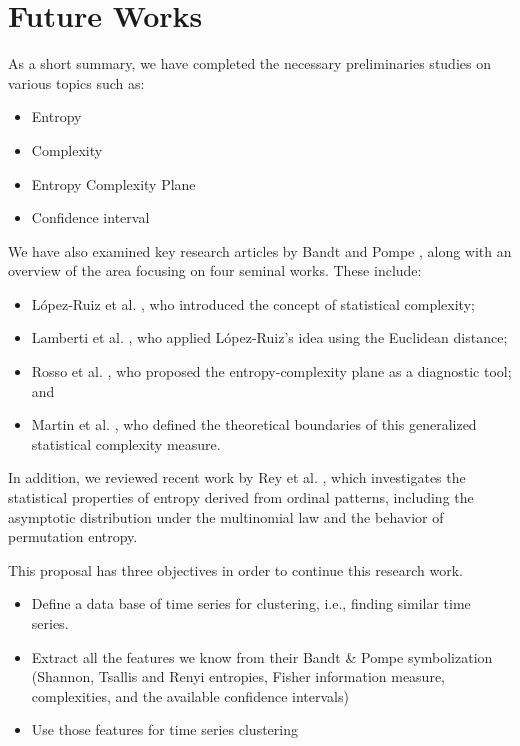 \chapter{Future Works}\label{C:futw}

As a short summary, we have completed the necessary preliminaries studies on various topics such as:
\begin{itemize}
    \item Entropy
    \item Complexity
    \item Entropy Complexity Plane
    \item Confidence interval
\end{itemize}

We have also examined key research articles by Bandt and Pompe \cite{PhysRevLett.88.174102}, along with an overview of the area focusing on four seminal works. These include:
\begin{itemize}
	\item López-Ruiz et al. \cite{lopez1995statistical}, who introduced the concept of statistical complexity;
	\item Lamberti et al. \cite{lamberti2004intensive}, who applied López-Ruiz's idea using the Euclidean distance;
	\item Rosso et al. \cite{EEGAnalysisUsingWaveletBasedInformationTools}, who proposed the entropy-complexity plane as a diagnostic tool; and
	\item Martin et al. \cite{Martin2006}, who defined the theoretical boundaries of this generalized statistical complexity measure.
\end{itemize}

In addition, we reviewed recent work by Rey et al. \cite{Rey2025,Rey2023a,Rey2023}, which investigates the statistical properties of entropy derived from ordinal patterns, including the asymptotic distribution under the multinomial law and the behavior of permutation entropy.

This proposal has three objectives in order to continue this research work.
\begin{itemize}
	\item Define a data base of time series for clustering, i.e., finding similar time series. 
	\item Extract all the features we know from their Bandt \& Pompe symbolization (Shannon, Tsallis and Renyi entropies, Fisher information measure, complexities, and the available confidence intervals)
	\item Use those features for time series clustering 
\end{itemize} 

